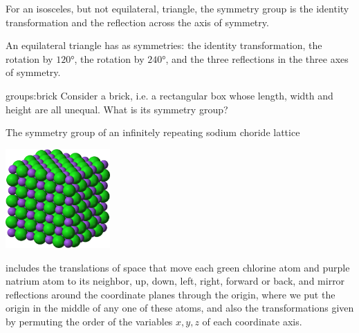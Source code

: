 \begin{example}
For an isosceles, but not equilateral, triangle, the symmetry group is the identity transformation and the reflection across the axis of symmetry.
\end{example}
\begin{example}
An equilateral triangle has as symmetries: the identity transformation, the rotation by \(120\si{\degree}\), the rotation by \(240\si{\degree}\), and the three reflections in the three axes of symmetry.
\end{example}
\begin{problem}{groups:brick}
Consider a brick, i.e. a rectangular box whose length, width and height are all unequal.
What is its symmetry group?
\end{problem}
\begin{example}
The symmetry group of an infinitely repeating sodium choride lattice
\begin{center}
\includegraphics[width=4cm]{Sodium-chloride-3D-ionic.png}
\end{center}
includes the translations of space that move each green chlorine atom and purple natrium atom to its neighbor, up, down, left, right, forward or back, and mirror reflections around the coordinate planes through the origin, where we put the origin in the middle of any one of these atoms, and also the transformations given by permuting the order of the variables \(x,y,z\) of each coordinate axis.
\end{example}
